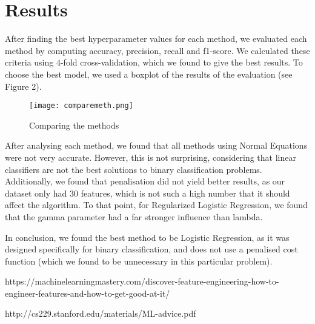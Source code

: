 \documentclass{article}
\begin{document}
	\section{Results}
	After finding the best hyperparameter values for each method, we evaluated each method by computing accuracy, precision, recall and f1-score. We calculated these criteria using $4$-fold cross-validation, which we found to give the best results. To choose the best model, we used a boxplot of the results of the evaluation (see Figure 2).

	\begin{figure}[h]
		\centering
		\texttt{[image: comparemeth.png]}
		\caption{Comparing the methods}
	\end{figure}

	After analysing each method, we found that all methods using Normal Equations were not very accurate. However, this is not surprising, considering that linear classifiers are not the best solutions to binary classification problems. Additionally, we found that penalisation did not yield better results, as our dataset only had $30$ features, which is not such a high number that it should affect the algorithm. To that point, for Regularized Logistic Regression, we found that the gamma parameter had a far stronger influence than lambda.

	In conclusion, we found the best method to be Logistic Regression, as it was designed specifically for binary classification, and does not use a penalised cost function (which we found to be unnecessary in this particular problem).

	\begin{thebibliography}{9}
		 https://machinelearningmastery.com/discover-feature-engineering-how-to-engineer-features-and-how-to-get-good-at-it/

		 http://cs229.stanford.edu/materials/ML-advice.pdf
	\end{thebibliography}
\end{document}
